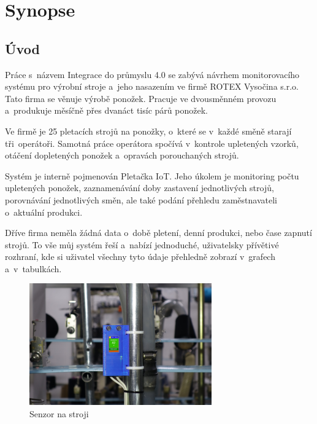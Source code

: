 \documentclass[12pt, a4paper]{article}
\begin{document}
\section*{Synopse}

\subsection*{Úvod}
Práce s~názvem Integrace do průmyslu 4.0 se zabývá návrhem monitorovacího systému pro výrobní stroje a~jeho nasazením ve firmě ROTEX Vysočina s.r.o. Tato firma se věnuje výrobě ponožek. Pracuje ve dvousměnném provozu a~produkuje měsíčně přes dvanáct tisíc párů ponožek.

Ve firmě je 25 pletacích strojů na ponožky, o~které se v~každé směně starají tři~operátoři.
Samotná práce operátora spočívá v~kontrole upletených vzorků, otáčení dopletených ponožek a~opravách porouchaných strojů.

Systém je interně pojmenován Pletačka IoT. 
Jeho úkolem je monitoring počtu upletených ponožek, zaznamenávání doby zastavení jednotlivých strojů, porovnávání jednotlivých směn, ale také podání přehledu zaměstnavateli o~aktuální produkci.

Dříve firma neměla žádná data o~době pletení, denní  produkci, nebo čase zapnutí strojů.
To vše  můj systém řeší  a~nabízí jednoduché, uživatelsky přívětivé rozhraní, kde si uživatel všechny tyto údaje přehledně zobrazí v~grafech a~v~tabulkách.

\begin{figure}[t]
    \centering
    \includegraphics[width=0.7\textwidth]{img/V2-uchyceni.png}
    \caption{Senzor na stroji}
    \label{fig:SenzorNaStroji}
\end{figure}


\end{document}
